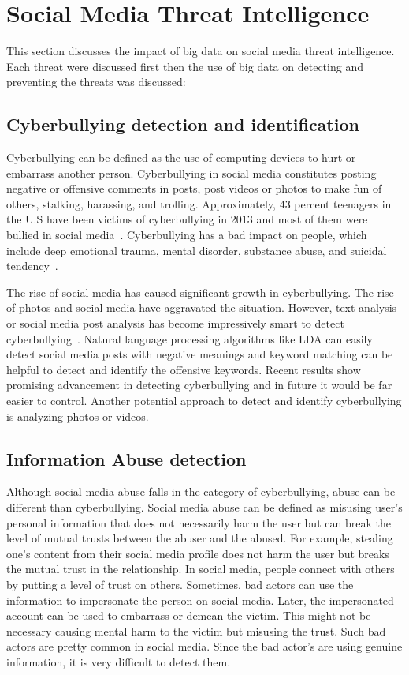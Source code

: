 \documentclass[sigconf]{acmart}
\begin{document}
\section{Social Media Threat Intelligence}
This section discusses the impact of big data on social media threat intelligence. Each threat were discussed first then the use of big data on detecting and preventing the threats was discussed:

\subsection{Cyberbullying detection and identification}
Cyberbullying can be defined as the use of computing devices to hurt or embarrass another person.  Cyberbullying in social media constitutes posting negative or offensive comments in posts, post videos or photos to make fun of others,  stalking, harassing, and trolling.  Approximately, 43 percent teenagers in the U.S have been victims of cyberbullying in 2013 and most of them were bullied in social media~\cite{cyberbullying}. Cyberbullying has a bad impact on people, which include deep emotional trauma, mental disorder, substance abuse, and suicidal tendency~\cite{cb-effect}. 

The rise of social media has caused significant growth in cyberbullying. The rise of photos and social media have aggravated the situation. However, text analysis or social media post analysis has become impressively smart to detect cyberbullying~\cite{HosseinmardiMRH15}. Natural language processing algorithms like LDA can easily detect social media posts with negative meanings and keyword matching can be helpful to detect and identify the offensive keywords. Recent results show promising advancement in detecting cyberbullying and in future it would be far easier to control. Another potential approach to detect and identify cyberbullying is analyzing photos or videos.

\subsection{Information Abuse detection}
Although social media abuse falls in the category of cyberbullying, abuse can be different than cyberbullying. Social media abuse can be defined as misusing user's personal information that does not necessarily harm the user but can break the level of mutual trusts between the abuser and the abused. For example, stealing one's content from their social media profile does not harm the user but breaks the mutual trust in the relationship. In social media, people connect with others by putting a level of trust on others. Sometimes, bad actors can use the information to impersonate the person on social media. Later, the impersonated account can be used to embarrass or demean the victim. This might not be necessary causing mental harm to the victim but misusing the trust. Such bad actors are pretty common in social media. Since the bad actor's are using genuine information, it is very difficult to detect them.
\end{document}
